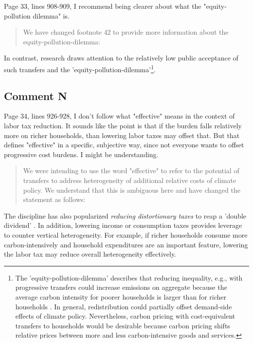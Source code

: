 \documentclass[11pt]{article}
\newenvironment{response}
{\begin{quote}\color{black}}
{\end{quote}}
\begin{document}
\begin{commentbox}
    Page 33, lines 908-909, I recommend being clearer about what the "equity-pollution dilemma" is.
\end{commentbox}

\begin{response}
    We have changed footnote 42 to provide more information about the equity-pollution-dilemma:
\end{response}

\begin{revisionbox}
    In contrast, research draws attention to the relatively low public acceptance of such transfers and the 'equity-pollution-dilemma'\footnote{The 'equity-pollution-dilemma' describes that reducing inequality, e.g., with progressive transfers could increase emissions on aggregate because the average carbon intensity for poorer households is larger than for richer households \autocite[see also][]{Stiglitz.2019}. In general, redistribution could partially offset demand-side effects of climate policy. Nevertheless, carbon pricing with cost-equivalent transfers to households would be desirable because carbon pricing shifts relative prices between more and less carbon-intensive goods and services.}\autocite{Sager.2019}.
\end{revisionbox}

\subsection*{Comment N}\label{comment_R1_N}

\begin{commentbox}
    Page 34, lines 926-928, I don't follow what "effective" means in the context of labor tax reduction. It sounds like the point is that if the burden falls relatively more on richer households, than lowering labor taxes may offset that. But that defines "effective" in a specific, subjective way, since not everyone wants to offset progressive cost burdens. I might be understanding.
\end{commentbox}

\begin{response}
    We were intending to use the word "effective" to refer to the potential of transfers to address heterogeneity of additional relative costs of climate policy. We understand that this is ambiguous here and have changed the statement as follows:
\end{response}

\begin{revisionbox}
    The discipline has also popularized \textit{reducing distortionary taxes} to reap a 'double dividend' \autocite{Bovenberg.1996}. In addition, lowering income or consumption taxes provides leverage to counter vertical heterogeneity. For example, if richer households consume more carbon-intensively and household expenditures are an important feature, lowering the labor tax may reduce overall heterogeneity effectively.
\end{revisionbox}
\end{document}
